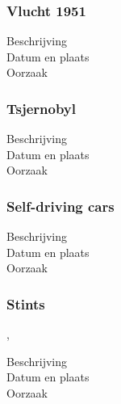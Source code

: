 \documentclass{article}
\begin{document}
			\subsubsection{Vlucht 1951}
			\begin{description}
				\item[Beschrijving]
				
				\item[Datum en plaats] 
				
				\item[Oorzaak]
				
			\end{description}
			
			\subsubsection{Tsjernobyl}
			\begin{description}
				\item[Beschrijving]
				
				\item[Datum en plaats] 
				
				\item[Oorzaak]
				
			\end{description}
			
			\subsubsection{Self-driving cars}
			\begin{description}
				\item[Beschrijving] 
				
				\item[Datum en plaats] 
				
				\item[Oorzaak]
				
			\end{description}
			
			\subsubsection{Stints},
			\begin{description}
				\item[Beschrijving] 
				
				\item[Datum en plaats] 
				
				\item[Oorzaak]
				
			\end{description}
			
\end{document}
